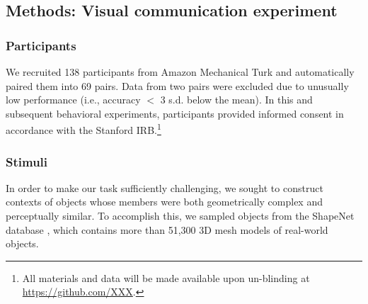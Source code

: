 \documentclass[10pt,letterpaper]{article}
\begin{document}


\subsection{Methods: Visual communication experiment}

\subsubsection{Participants} We recruited 138 participants from Amazon Mechanical Turk and automatically paired them into 69 pairs.
Data from two pairs were excluded due to unusually low performance (i.e., accuracy $<$ 3 s.d. below the mean).
In this and subsequent behavioral experiments, participants provided informed consent in accordance with the Stanford IRB.\footnote{All materials and data will be made available upon un-blinding at \url{https://github.com/XXX}.}

\subsubsection{Stimuli}

In order to make our task sufficiently challenging, we sought to construct contexts of objects whose members were both geometrically complex and perceptually similar.
To accomplish this, we sampled objects from the ShapeNet database \cite{chang2015shapenet}, which contains more than 51,300 3D mesh models of real-world objects. %
\end{document}

